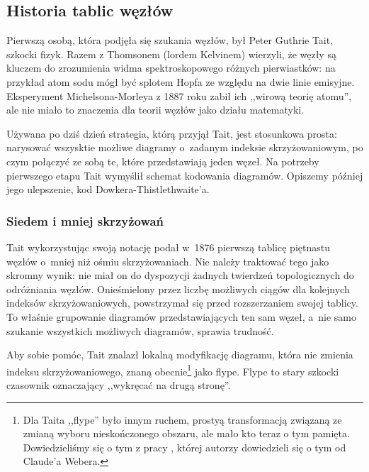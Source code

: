 \subsection{Historia tablic węzłów}
Pierwszą osobą, która podjęła się szukania węzłów, był Peter Guthrie Tait, szkocki fizyk.
Razem z Thomsonem (lordem Kelvinem) wierzyli, że węzły są kluczem do zrozumienia widma spektroskopowego różnych pierwiastków: na przykład atom sodu mógł być splotem Hopfa ze względu na dwie linie emisyjne.
Eksperyment Michelsona-Morleya z 1887 roku zabił ich ,,wirową teorię atomu'', ale nie miało to znaczenia dla teorii węzłów jako działu matematyki.

Używana po dziś dzień strategia, którą przyjął Tait, jest stosunkowa prosta: narysować wszysktie możliwe diagramy o~zadanym indeksie skrzyżowaniowym, po czym połączyć ze sobą te, które przedstawiają jeden węzeł.
Na potrzeby pierwszego etapu Tait wymyślił schemat kodowania diagramów.
Opiszemy później jego ulepszenie, kod Dowkera-Thistlethwaite'a.

\subsubsection{Siedem i mniej skrzyżowań}
Tait wykorzystując swoją notację podał w~1876 pierwszą tablicę piętnastu węzłów o~mniej niż ośmiu skrzyżowaniach.
Nie należy traktować tego jako skromny wynik: nie miał on do dyspozycji żadnych twierdzeń topologicznych do odróżniania węzłów.
Onieśmielony przez liczbę możliwych ciągów dla kolejnych indeksów skrzyżowaniowych, powstrzymał się przed rozszerzaniem swojej tablicy.
To właśnie grupowanie diagramów przedstawiających ten sam węzeł, a~nie samo szukanie wszystkich możliwych diagramów, sprawia trudność.

Aby sobie pomóc, Tait znalazł lokalną modyfikację diagramu, która nie zmienia indeksu skrzyżowaniowego, znaną obecnie\footnote{Dla Taita ,,flype'' było innym ruchem, prostyą transformacją związaną ze zmianą wyboru nieskończonego obszaru, ale mało kto teraz o tym pamięta. Dowiedzieliśmy się o tym z pracy \cite{menasco93}, której autorzy dowiedzieli się o tym od Claude'a Webera.} jako flype.
Flype to stary szkocki czasownik oznaczający ,,wykręcać na drugą stronę''.

